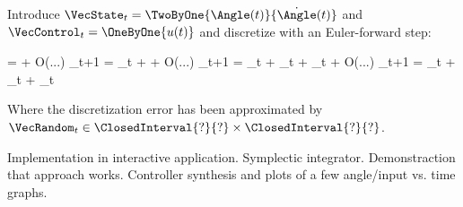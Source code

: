     Introduce $\VecState_t = \TwoByOne{\Angle(t)}{\dot\Angle(t)}$ and $\VecControl_t = \OneByOne{u(t)}$ and discretize with an Euler-forward step:

    \startformula
        \startalign[n=3,align={middle,right,left}]
            \NC 
            \NC \DDt {} = 
            \NC {} + O(...)
            \NR
            \NC \Rightarrow \quad
            \NC \VecState_{t+1} =
            \NC \VecState_{t}
                + \DDt {} \Deltat
                + O(...)
            \NR
            \NC \Rightarrow \quad
            \NC \VecState_{t+1} =
            \NC \VecState_{t}
                + \Deltat {} \VecState_t
                + \Deltat {} \VecControl_t
                + O(...)
            \NR
            \NC \Rightarrow \quad
            \NC \VecState_{t+1} =
            \NC {} \VecState_t
                +  \VecControl_t
                + \VecRandom_t
            \NR
        \stopalign
    \stopformula

    Where the discretization error has been approximated by $\VecRandom_t \in \ClosedInterval{?}{?} \times \ClosedInterval{?}{?}$.

\stopsubsection


\startsubsection[title={Solution}]

    Implementation in interactive application.
    Symplectic integrator.
    Demonstraction that approach works.
    Controller synthesis and plots of a few angle/input vs. time graphs.

\stopsubsection

